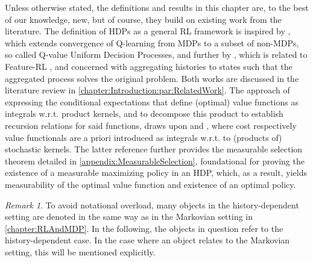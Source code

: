 \documentclass[
    a4paper,
    11pt,
    bibliography=totoc,
    listof=totoc,      
    headinclude=true,
    cleardoublepage=empty,
]{scrbook}
\theoremstyle{plain}
\theoremstyle{definition}
\theoremstyle{remark}
\newtheorem{remark}[theorem]{Remark}
\begin{document}
Unless otherwise stated, the definitions and results in this chapter are, to the best of our knowledge, new, but  of course, they build on existing work from the literature. The
definition of HDPs as a general RL framework is inspired by 
\cite{majeed2018_qcndp}, which extends convergence of Q-learning 
from MDPs to a subset of non-MDPs, so called Q-value Uniform Decision Processes, 
and further by \cite{hutter2016_esabmdp}, which is related to Feature-RL 
\cite{hutter2009_frlpum}, and concerned with aggregating histories to states 
such that the aggregated process solves the original problem. Both works are 
discussed in the literature review in \cref{chapter:Introduction:par:RelatedWork}. The approach of 
expressing the conditional expectations that define (optimal) value functions 
as integrals w.r.t. product kernels, and to decompose this product to 
establish recursion relations for said functions, draws upon
\cite[Chapters~9. to 11.]{bertsekas1996_socdc} and 
\cite[Chapter~16]{hinderer2016_do}, where cost respectively value functionals
are a priori introduced as integrals w.r.t. to (products of) stochastic 
kernels. The latter reference further provides the measurable selection 
theorem detailed in \cref{appendix:MeasurableSelection}, foundational for 
proving the existence of a measurable maximizing policy in an HDP, which, as a 
result, yields measurability of the optimal value function and existence of an 
optimal policy.
 
\begin{remark}
    To avoid notational overload, many objects in the history-dependent 
    setting are denoted in the same way as in the Markovian setting in 
    \cref{chapter:RLAndMDP}. In the following, the objects in question 
    refer to the history-dependent case. In the case where an object relates 
    to the Markovian setting, this will be mentioned explicitly.
\end{remark}

\end{document}
